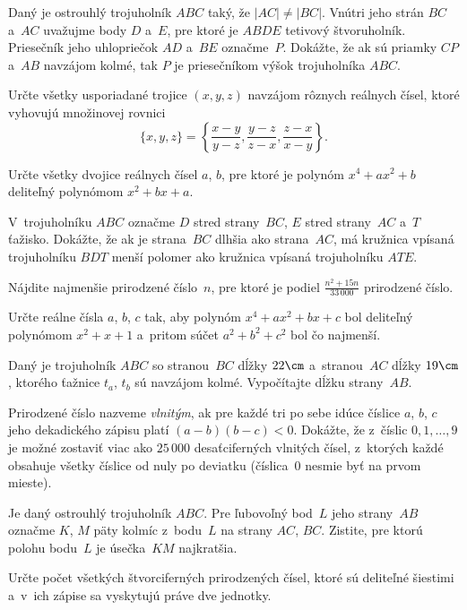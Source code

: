 {%
Daný je ostrouhlý trojuholník $ABC$ taký, že $|AC|\ne |BC|$.
Vnútri jeho strán $BC$ a~$AC$ uvažujme body $D$ a~$E$, pre ktoré je
$ABDE$ tetivový štvoruholník. Priesečník jeho uhlopriečok $AD$ a~$BE$
označme~$P$. Dokážte, že ak sú priamky $CP$ a~$AB$ navzájom kolmé, tak $P$
je priesečníkom výšok trojuholníka $ABC$.}

{%
Určte všetky usporiadané trojice $(x,y,z)$ navzájom rôznych reálnych
čísel, ktoré vyhovujú množinovej rovnici
$$
\{x,y,z\}=
     \left\{\frac{x-y}{y-z},\frac{y-z}{z-x},\frac{z-x}{x-y}\right\}.
$$}

{%
Určte všetky dvojice reálnych čísel $a$, $b$, pre ktoré je polynóm $x^4+ax^2+b$ deliteľný polynómom $x^2+bx+a$.}

{%
V~trojuholníku $ABC$ označme $D$ stred strany~$BC$, $E$ stred strany~$AC$ a~$T$ ťažisko. Dokážte, že ak je strana~$BC$ dlhšia ako strana~$AC$, má kružnica vpísaná trojuholníku $BDT$ menší polomer ako kružnica vpísaná trojuholníku $ATE$.}

{%
Nájdite najmenšie prirodzené číslo~$n$, pre ktoré je podiel $\displaystyle\frac {n^2+15n}{33\,000}$ prirodzené číslo.}

{%
Určte reálne čísla $a$, $b$, $c$ tak, aby polynóm $x^4+ax^2+bx+c$ bol deliteľný polynómom $x^2+x+1$ a~pritom súčet $a^2+b^2+c^2$ bol čo najmenší.}

{%
Daný je trojuholník $ABC$ so stranou~$BC$ dĺžky $22\cm$ a~stranou~$AC$ dĺžky $19\cm$, ktorého ťažnice $t_a$, $t_b$ sú navzájom kolmé. Vypočítajte dĺžku strany~$AB$.}

{%
Prirodzené číslo nazveme {\it vlnitým}, ak pre každé tri po sebe idúce číslice $a$, $b$, $c$ jeho dekadického zápisu platí $(a-b)(b-c)<0$. Dokážte, že z~číslic $0,1,\dots,9$ je možné zostaviť viac ako $25\,000$ desaťciferných vlnitých čísel, z~ktorých každé obsahuje všetky číslice od nuly po deviatku (číslica~$0$ nesmie byť na prvom mieste).}

{%
Je daný ostrouhlý trojuholník $ABC$. Pre ľubovoľný bod~$L$ jeho strany~$AB$ označme $K$, $M$ päty kolmíc z~bodu~$L$ na strany $AC$, $BC$. Zistite, pre ktorú polohu bodu~$L$ je úsečka~$KM$ najkratšia.}

{%
Určte počet všetkých štvorciferných prirodzených čísel, ktoré sú deliteľné šiestimi a~v~ich zápise sa vyskytujú práve dve jednotky.}

